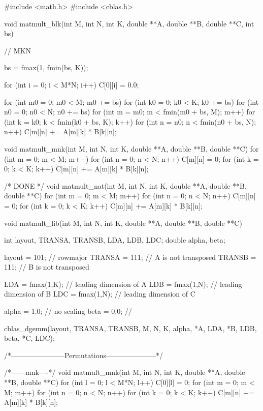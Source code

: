 #include <math.h>
#include <cblas.h>


void matmult_blk(int M, int N, int K, double **A, double **B, double **C, int bs) 
{
	// MKN

	bs = fmax(1, fmin(bs, K));

	for (int i = 0; i < M*N; i++)
		C[0][i] = 0.0;

	for (int m0 = 0; m0 < M; m0 += bs)
	{
		for (int k0 = 0; k0 < K; k0 += bs)
		{
			for (int n0 = 0; n0 < N; n0 += bs)
			{
				for (int m = m0; m < fmin(m0 + bs, M); m++)
				{
					for (int k = k0; k < fmin(k0 + bs, K); k++)
					{
						for (int n = n0; n < fmin(n0 + bs, N); n++)
							C[m][n] += A[m][k] * B[k][n];
					}
				}
			}
		}
	}

}

void matmult_mnk(int M, int N, int K, double **A, double **B, double **C) {
    for (int m = 0; m < M; m++) {
    	for (int n = 0; n < N; n++) {
			C[m][n] = 0;
			for (int k = 0; k < K; k++) {
				C[m][n] += A[m][k] * B[k][n];
			}
    	}	
    }
}






/*			DONE			*/
void matmult_nat(int M, int N, int K, double **A, double **B, double **C) {
	for (int m = 0; m < M; m++) {
		for (int n = 0; n < N; n++) {
			C[m][n] = 0;
			for (int k = 0; k < K; k++) {
				C[m][n] += A[m][k] * B[k][n];
			}
    	}	
    }
}

void matmult_lib(int M, int N, int K, double **A, double **B, double **C) {
	int layout, TRANSA, TRANSB, LDA, LDB, LDC;
	double alpha, beta;

    layout = 101; // rowmajor
	TRANSA = 111; // A is not transposed
	TRANSB = 111; // B is not transposed


	LDA = fmax(1,K); // leading dimension of A
	LDB = fmax(1,N); // leading dimension of B
	LDC = fmax(1,N); // leading dimension of C

	alpha = 1.0; // no scaling
	beta = 0.0; //

	cblas_dgemm(layout, TRANSA, TRANSB, M, N, K, alpha, *A, LDA, *B, LDB, beta, *C, LDC);    
}

/*-----------------------Permutations---------------------*/

/*------mnk----*/
void matmult_mnk(int M, int N, int K, double **A, double **B, double **C) {
	for (int l = 0; l < M*N; l++) {
	C[0][l] = 0;
	}
    	for (int m = 0; m < M; m++) {
    		for (int n = 0; n < N; n++) {
			for (int k = 0; k < K; k++) {
				C[m][n] += A[m][k] * B[k][n];
		}
    	}	
    }
}

